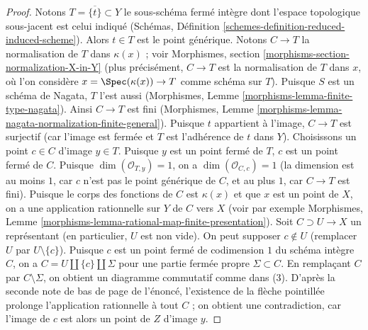 \begin{proof}
\medskip\noindent
Notons $T = \overline{\{t\}} \subset Y$ le sous-schéma fermé intègre
dont l'espace topologique sous-jacent est celui indiqué
(Schémas, Définition \ref{schemes-definition-reduced-induced-scheme}).
Alors $t \in T$ est le point générique.
Notons $C \to T$ la normalisation de $T$ dans $\kappa(x)$ ; voir
Morphismes, section \ref{morphisms-section-normalization-X-in-Y}
(plus précisément, $C \to T$ est la normalisation de $T$ dans $x$,
où l'on considère $x = \Spec(\kappa(x)) \to T$ comme schéma sur $T$).
Puisque $S$ est un schéma de Nagata, $T$ l'est aussi
(Morphismes, Lemme \ref{morphisms-lemma-finite-type-nagata}).
Ainsi $C \to T$ est fini
(Morphismes, Lemme \ref{morphisms-lemma-nagata-normalization-finite-general}).
Puisque $t$ appartient à l'image, $C \to T$ est surjectif (car
l'image est fermée et $T$ est l'adhérence de $t$ dans $Y$).
Choisissons un point $c \in C$ d'image $y \in T$.
Puisque $y$ est un point fermé de $T$, $c$ est
un point fermé de $C$. Puisque $\dim(\mathcal{O}_{T, y}) = 1$,
on a $\dim(\mathcal{O}_{C, c}) = 1$ (la dimension est
au moins $1$, car $c$ n'est pas le point générique de $C$, et
au plus $1$, car $C \to T$ est fini).
Puisque le corps des fonctions de $C$ est $\kappa(x)$ et que $x$
est un point de $X$, on a une application rationnelle sur $Y$ de $C$ vers $X$
(voir par exemple Morphismes, Lemme
\ref{morphisms-lemma-rational-map-finite-presentation}).
Soit $C \supset U \to X$ un représentant (en particulier, $U$ est non vide).
On peut supposer $c \not \in U$ (remplacer $U$ par $U \setminus \{c\}$).
Puisque $c$ est un point fermé de codimension $1$ du schéma intègre $C$,
on a $C = U \amalg \{c\} \amalg \Sigma$
pour une partie fermée propre $\Sigma \subset C$.
En remplaçant $C$ par $C \setminus \Sigma$,
on obtient un diagramme commutatif comme dans (3).
D'après la seconde note de bas de page de l'énoncé,
l'existence de la flèche pointillée prolonge
l'application rationnelle à tout $C$ ; on obtient une contradiction,
car l'image de $c$ est alors un point de $Z$ d'image $y$.
\end{proof}

